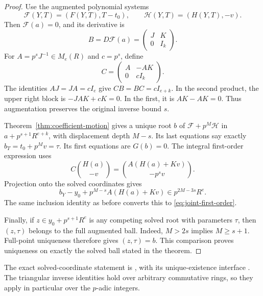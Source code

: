 \begin{proof}
Use the augmented polynomial systems
\[
 \mathcal F(Y,T)=(F(Y,T),T-t_0),\qquad
 \mathcal H(Y,T)=(H(Y,T),-v).
\]
Then $\mathcal F(a)=0$, and its derivative is
\[
 B=D\mathcal F(a)=\begin{pmatrix}J&K\\0&I_k\end{pmatrix}.
\]
For $A=p^sJ^{-1}\in M_e(R)$ and $c=p^s$, define
\[
 C=\begin{pmatrix}A&-AK\\0&cI_k\end{pmatrix}.
\]
The identities $AJ=JA=cI_e$ give $CB=BC=cI_{e+k}$. In the second
product, the upper right block is $-JAK+cK=0$. In the first, it is
$AK-AK=0$. Thus augmentation preserves the original inverse bound $s$.

Theorem~\ref{thm:coefficient-motion} gives a unique root $b$ of
$\mathcal F+p^M\mathcal H$ in $a+p^{s+1}R^{e+k}$, with displacement
depth $M-s$. Its last equations say exactly
$b_T=t_0+p^Mv=\tau$. Its first equations are $G(b)=0$.
The integral first-order expression uses
\[
 C\binom{H(a)}{-v}
 =\binom{A(H(a)+Kv)}{-p^sv}.
\]
Projection onto the solved coordinates gives
\[
 b_Y-y_0+p^{M-s}A(H(a)+Kv)\in p^{2M-3s}R^e.
\]
The same inclusion identity as before converts this to
\eqref{eq:joint-first-order}.

Finally, if $z\in y_0+p^{s+1}R^e$ is any competing solved root with
parameters $\tau$, then $(z,\tau)$ belongs to the full augmented ball.
Indeed, $M>2s$ implies $M\ge s+1$. Full-point uniqueness therefore gives
$(z,\tau)=b$. This comparison proves uniqueness on exactly the solved
ball stated in the theorem.
\end{proof}

The exact solved-coordinate statement is
,
with its unique-existence interface
.
The triangular inverse identities hold over arbitrary commutative rings,
so they apply in particular over the $p$-adic integers.

